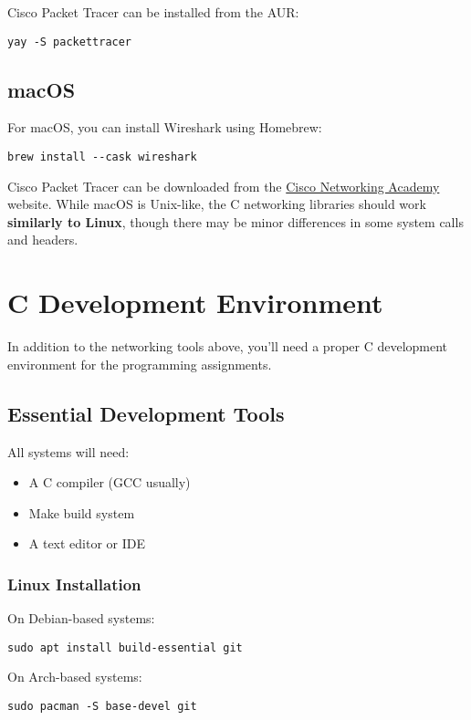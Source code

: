 Cisco Packet Tracer can be installed from the AUR:
\begin{verbatim}
yay -S packettracer
\end{verbatim}

\subsection{macOS}
For macOS, you can install Wireshark using Homebrew:
\begin{verbatim}
brew install --cask wireshark
\end{verbatim}

Cisco Packet Tracer can be downloaded from the \href{https://www.netacad.com/courses/packet-tracer}{Cisco Networking Academy} website. While macOS is Unix-like, the C networking libraries should work \textbf{similarly to Linux}, though there may be minor differences in some system calls and headers.

\section{C Development Environment}

In addition to the networking tools above, you'll need a proper C development environment for the programming assignments.

\subsection{Essential Development Tools}

All systems will need:
\begin{itemize}
    \item A C compiler (GCC usually)
    \item Make build system
    \item A text editor or IDE
\end{itemize}

\subsubsection{Linux Installation}

On Debian-based systems:
\begin{verbatim}
sudo apt install build-essential git
\end{verbatim}

On Arch-based systems:
\begin{verbatim}
sudo pacman -S base-devel git
\end{verbatim}

